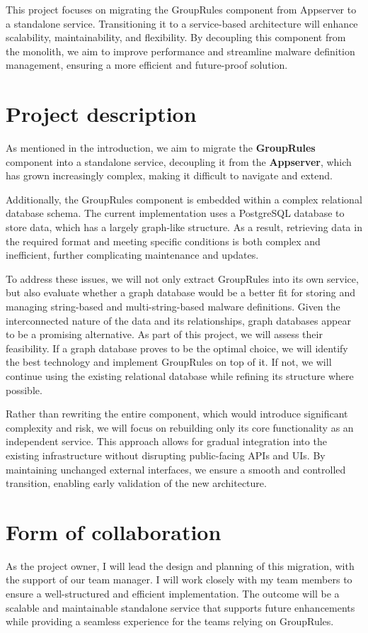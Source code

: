 \documentclass{article}
\begin{document}
This project focuses on migrating the GroupRules component from Appserver to a standalone service.
Transitioning it to a service-based architecture will enhance scalability, maintainability, and
flexibility. By decoupling this component from the monolith, we aim to improve performance and
streamline malware definition management, ensuring a more efficient and future-proof solution.

\section{Project description}

As mentioned in the introduction, we aim to migrate the \textbf{GroupRules} component into a
standalone service, decoupling it from the \textbf{Appserver}, which has grown increasingly
complex, making it difficult to navigate and extend.

Additionally, the GroupRules component is embedded within a complex relational database schema.
The current implementation uses a PostgreSQL database to store data, which has a largely
graph-like structure. As a result, retrieving data in the required format and meeting specific
conditions is both complex and inefficient, further complicating maintenance and updates.

To address these issues, we will not only extract GroupRules into its own service, but also
evaluate whether a graph database would be a better fit for storing and managing string-based and
multi-string-based malware definitions. Given the interconnected nature of the data and its
relationships, graph databases appear to be a promising alternative. As part of this project, we
will assess their feasibility. If a graph database proves to be the optimal choice, we will
identify the best technology and implement GroupRules on top of it. If not, we will continue using
the existing relational database while refining its structure where possible.

Rather than rewriting the entire component, which would introduce significant complexity and risk,
we will focus on rebuilding only its core functionality as an independent service. This approach
allows for gradual integration into the existing infrastructure without disrupting public-facing
APIs and UIs. By maintaining unchanged external interfaces, we ensure a smooth and controlled
transition, enabling early validation of the new architecture.

\section{Form of collaboration}

As the project owner, I will lead the design and planning of this migration, with the support of
our team manager. I will work closely with my team members to ensure a well-structured and
efficient implementation. The outcome will be a scalable and maintainable standalone service that
supports future enhancements while providing a seamless experience for the teams relying on
GroupRules.
\end{document}
